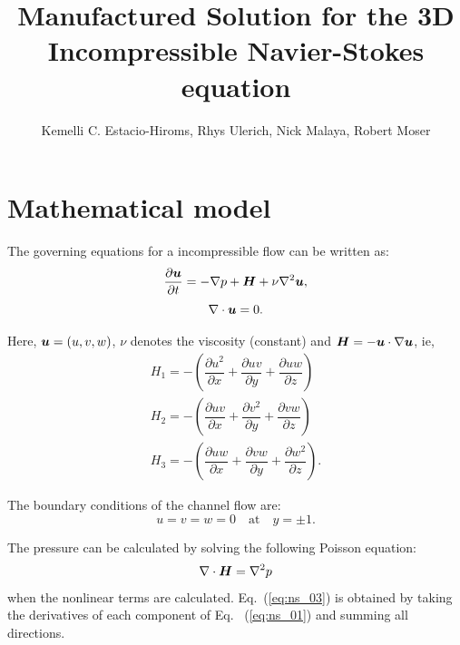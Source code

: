 \documentclass[10pt]{article}
\title{Manufactured Solution for the 3D Incompressible Navier-Stokes equation}
\author{Kemelli C. Estacio-Hiroms, Rhys Ulerich, Nick Malaya, Robert Moser}
\newcommand{\diff}[2] {\dfrac{\partial #1}{\partial #2}}
\newcommand{\bv}[1]{\ensuremath{\mbox{\boldmath$ #1 $}}}
\begin{document}
	
\maketitle
% 





\section{Mathematical model}
The governing equations for a incompressible flow can be written as:%
\begin{equation}
 \label{eq:ns_01}
\diff{\bv{u}}{t}  = -\nabla p +\bv{H} +  \nu \nabla^2 \bv{u},
\end{equation}
\begin{equation}
 \label{eq:ns_02}
\nabla \cdot \bv{u} = 0.
\end{equation}




Here, $\bv{u}=(u,v,w)$,  $\nu$ denotes the viscosity (constant) and $\bv{H}=-\bv{u}\cdot\nabla\bv{u}$, ie,
\begin{eqnarray}
 H_1 = - \left(\diff{ u^2}{x}+\diff{ uv }{y} +\diff{ uw}{z} \right)\\
 H_2 = - \left(\diff{ uv }{x}+\diff{ v^2}{y} +\diff{ vw}{z} \right)\\
 H_3 = - \left(\diff{ uw }{x}+\diff{ vw }{y} +\diff{ w^2}{z} \right).
\end{eqnarray}

The boundary conditions of the channel flow are:
$$u=v=w =0 \quad \mbox{at} \quad y=\pm 1.$$

The pressure can be calculated by solving the following Poisson equation:
\begin{equation}
\label{eq:ns_03}
\nabla \cdot \bv{H} = \nabla^2 p 
\end{equation}
when the nonlinear terms are calculated. Eq.~(\ref{eq:ns_03}) is obtained by taking the derivatives of each component of Eq.~ (\ref{eq:ns_01}) and summing all directions.
\end{document}
